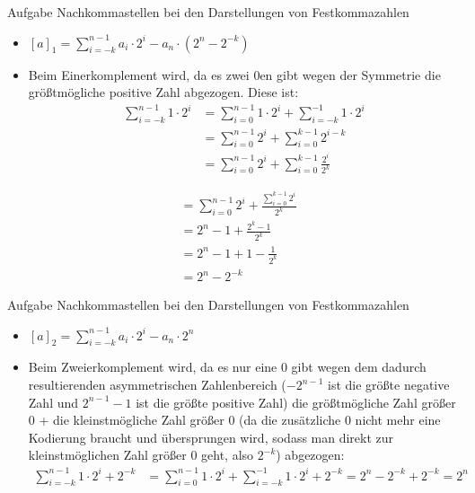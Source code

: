 \begin{frame}{Aufgabe \thesection}{Nachkommastellen bei den Darstellungen von Festkommazahlen\vspace{0.5cm}}
    \begin{solutionnoinc}
        \begin{itemize}
            \item $\displaystyle[a]_{1}=\textstyle{\sum_{i=-k}^{n-1}a_{i}\cdot2^{i}-a_{n}\cdot(2^{n}-2^{-k})}$
            \item Beim \alert{Einerkomplement} wird, da es zwei $0$en gibt wegen der Symmetrie die größtmögliche positive Zahl abgezogen. Diese ist: 
            \begin{align*}
            \sum_{i=-k}^{n-1}1\cdot2^{i} &= \sum_{i=0}^{n-1}1\cdot2^{i} + \sum_{i=-k}^{-1}1\cdot2^{i} \\
            &= \sum_{i=0}^{n-1}2^{i} + \sum_{i=0}^{k-1} 2^{i-k}\\
            &= \sum_{i=0}^{n-1}2^{i} + \sum_{i=0}^{k-1} \frac{2^{i}}{2^k}
            \end{align*}
        \end{itemize}
    \end{solutionnoinc}
    \begin{solutionnoinc}
\begin{align*}
      &= \sum_{i=0}^{n-1}2^{i} +  \frac{\sum_{i=0}^{k-1} 2^{i}}{2^k} \\
      & = 2^n-1+\frac{2^k-1}{2^k}\\
      & = 2^n-1+1-\frac{1}{2^k}\\
      & = 2^n-2^{-k}
      \end{align*}
    \end{solutionnoinc}
\end{frame}

\begin{frame}[allowframebreaks]{Aufgabe \thesection}{Nachkommastellen bei den Darstellungen von Festkommazahlen}
    \begin{solution}
        \begin{itemize}
            \item $\displaystyle [a]_{2}=\textstyle{\sum_{i=-k}^{n-1}a_{i}\cdot2^{i}-a_{n}\cdot2^{n}}$
            \item Beim \alert{Zweierkomplement} wird, da es nur eine $0$ gibt wegen dem dadurch resultierenden asymmetrischen Zahlenbereich ($-2^{n-1}$ ist die größte negative Zahl und $2^{n-1}-1$ ist die größte positive Zahl) die größtmögliche Zahl größer $0$ + die kleinstmögliche Zahl größer $0$ (da die zusätzliche $0$ nicht mehr eine Kodierung braucht und übersprungen wird, sodass man direkt zur kleinstmöglichen Zahl größer $0$ geht, also $2^{-k}$) abgezogen:
            \begin{align*}
            \sum_{i=-k}^{n-1}1\cdot2^{i} + 2^{-k} &= \sum_{i=0}^{n-1}1\cdot2^{i} + \sum_{i=-k}^{-1}1\cdot2^{i} + 2^{-k} = 2^n-2^{-k} + 2^{-k} = 2^n
            \end{align*}
        \end{itemize}
    \end{solution}
\end{frame}

